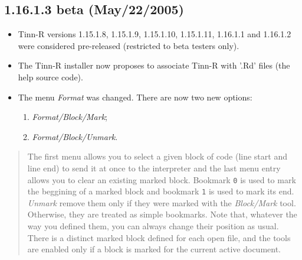 \subsection*{1.16.1.3 beta (May/22/2005)}
\begin{itemize}
  \item Tinn-R versions 1.15.1.8, 1.15.1.9, 1.15.1.10, 1.15.1.11, 1.16.1.1
    and 1.16.1.2 were considered pre-released (restricted to beta
    testers only).
  \item The Tinn-R installer now proposes to associate Tinn-R with '.Rd'
    files (the \RR{} help source code).
  \item The menu \textit{Format} was changed. There are now two new
    options:
    \begin{enumerate}
      \item \textit{Format/Block/Mark};
      \item \textit{Format/Block/Unmark}.
    \end{enumerate}
\end{itemize}

\begin{footnotesize}
  \begin{quotation}
    The first menu allows you to select a given block of code (line start and
    line end) to send it at once to the \RR{} interpreter and the last menu
    entry allows you to clear an existing marked block.
    Bookmark \texttt{0} is used to mark the beggining of a marked block and
    bookmark \texttt{1} is used to mark its end. \textit{Unmark} remove them
    only if they were marked with the \textit{Block/Mark} tool. Otherwise, they
    are treated as simple bookmarks. Note that, whatever the way you defined
    them, you can always change their position as usual.
    There is a distinct marked block defined for each open file, and the tools
    are enabled only if a block is marked for the current active document.
  \end{quotation}
\end{footnotesize}

